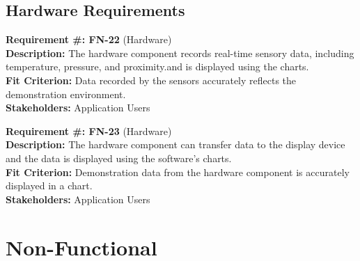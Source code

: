 \documentclass[12pt, titlepage]{article}
\begin{document}
\subsection{Hardware Requirements}
\begin{flushleft}
\textbf{Requirement \#: FN-22} (Hardware) \\
\textbf{Description:} The hardware component records real-time sensory data, including temperature, pressure, and proximity.and is displayed using the charts.  \\
\textbf{Fit Criterion:} Data recorded by the sensors accurately reflects the demonstration environment. \\
\textbf{Stakeholders:} Application Users \\
\end{flushleft}
\begin{flushleft}
\textbf{Requirement \#: FN-23} (Hardware) \\
\textbf{Description:} The hardware component can transfer data to the display device and the data is displayed using the software's charts.  \\
\textbf{Fit Criterion:} Demonstration data from the hardware component is accurately displayed in a chart. \\
\textbf{Stakeholders:} Application Users \\
\end{flushleft}


\section{Non-Functional}
\end{document}
